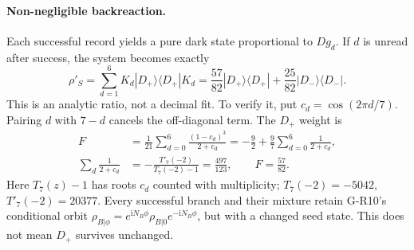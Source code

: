 \documentclass[11pt,a4paper]{article}
\newcommand{\ii}{\mathrm i}
\newcommand{\ket}[1]{|#1\rangle}
\newcommand{\bra}[1]{\langle#1|}
\begin{document}
\paragraph{Non-negligible backreaction.}
Each successful record yields a pure dark state proportional to
$Dg_d$. If $d$ is unread after success, the system becomes exactly
\begin{equation}
 \rho'_S=\sum_{d=1}^6K_d\ket{D_+}\bra{D_+}K_d
 =\frac{57}{82}\ket{D_+}\bra{D_+}
  +\frac{25}{82}\ket{D_-}\bra{D_-}.\label{backreaction}
\end{equation}
This is an analytic ratio, not a decimal fit. To verify it, put
$c_d=\cos(2\pi d/7)$. Pairing $d$ with $7-d$ cancels the off-diagonal
term. The $D_+$ weight is
\begin{align}
 F&=\frac1{21}\sum_{d=0}^6\frac{(1-c_d)^3}{2+c_d}
   =-\frac92+\frac97\sum_{d=0}^6\frac1{2+c_d},\\
 \sum_d\frac1{2+c_d}
 &=-\frac{T'_7(-2)}{T_7(-2)-1}=\frac{497}{123},\qquad F=\frac{57}{82}.
\end{align}
Here $T_7(z)-1$ has roots $c_d$ counted with multiplicity;
$T_7(-2)=-5042$, $T'_7(-2)=20377$. Every successful branch and their
mixture retain G-R10's conditional orbit
$\rho_{B|\phi}=e^{\ii N_B\phi}\rho_{B|0}e^{-\ii N_B\phi}$,
but with a changed seed state. This does not mean $D_+$ survives unchanged.

\newpage
\end{document}
